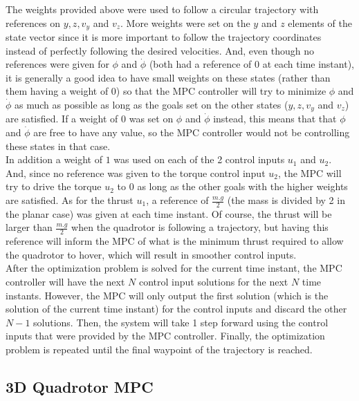 \documentclass{thesisreport}
\begin{document}
The weights provided above were used to follow a circular trajectory with references on $y,z,v_y$ and $v_z$. 
More weights were set on the $y$ and $z$ elements of the state vector since it is more important to follow the trajectory coordinates instead of perfectly following the desired velocities. And, even though no references were given for $\phi$ and $\dot{\phi}$ (both had a reference of $0$ at each time instant), it is generally a good idea to have small weights on these states (rather than them having a weight of 0) so that the MPC controller will try to minimize $\phi$ and $\dot{\phi}$ as much as possible as long as the goals set on the other states ($y,z,v_y$ and $v_z$) are satisfied. If a weight of $0$ was set on $\phi$ and $\dot{\phi}$ instead, this means that that $\phi$ and $\dot{\phi}$ are free to have any value, so the MPC controller would not be controlling these states in that case.\\

In addition a weight of $1$ was used on each of the 2 control inputs $u_1$ and $u_2$. And, since no reference was given to the torque control input $u_2$, the MPC will try to drive the torque $u_2$ to $0$ as long as the other goals with the higher weights are satisfied. As for the thrust $u_1$, a reference of $\frac{m.g}{2}$ (the mass is divided by 2 in the planar case) was given at each time instant. Of course, the thrust will be larger than $\frac{m.g}{2}$ when the quadrotor is following a trajectory, but having this reference will inform the MPC of what is the minimum thrust required to allow the quadrotor to hover, which will result in smoother control inputs. \\

After the optimization problem is solved for the current time instant, the MPC controller will have the next $N$ control input solutions for the next $N$ time instants. However, the MPC will only output the first solution (which is the solution of the current time instant) for the control inputs and discard the other $N-1$ solutions. Then, the system will take 1 step forward using the control inputs that were provided by the MPC controller. Finally, the optimization problem is repeated until the final waypoint of the trajectory is reached.

\newpage

\subsection{3D Quadrotor MPC}\label{subsec:3D_Quadrotor_MPC}
\end{document}
